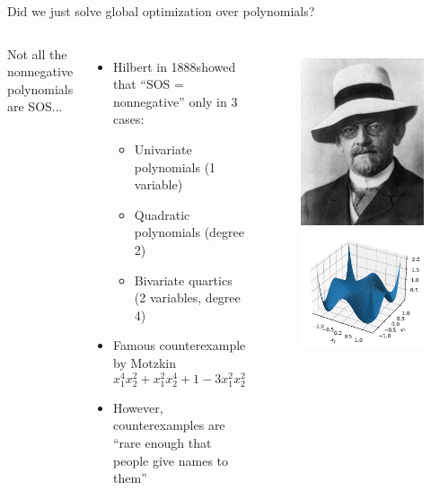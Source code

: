 \documentclass[aspectratio=169]{beamer}
\begin{document}
\begin{frame}{Did we just solve global optimization over polynomials?}
\begin{columns}
Not all the nonnegative polynomials are SOS...
\begin{itemize}
\item
Hilbert in 1888\footnotemark showed that ``SOS = nonnegative'' only in 3 cases\footnotemark:
\begin{itemize}
\item
Univariate polynomials (1 variable)
\item
Quadratic polynomials (degree 2)
\item
Bivariate quartics (2 variables, degree 4)
\end{itemize}
\item
Famous counterexample by Motzkin
$$x_1^4 x_2^2 + x_1^2 x_2^4 + 1 - 3 x_1^2 x_2 ^2$$
\item
However, counterexamples are ``rare enough that people give names to them''
\end{itemize}
\begin{figure}
\includegraphics[width=.4\columnwidth]{figures/hilbert.jpg}
\includegraphics[width=\columnwidth]{figures/motzkin.pdf}

\end{figure}
\end{columns}
\end{frame}
\end{document}
